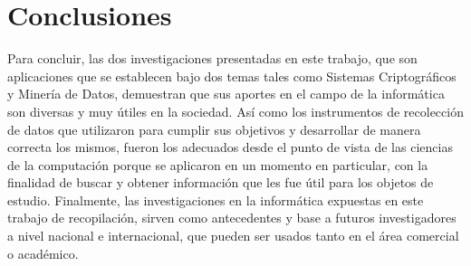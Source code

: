 \documentclass[10pt,journal]{IEEEtran}
\begin{document}
    \section{\textbf{Conclusiones}}
    Para concluir, las dos investigaciones presentadas en este trabajo,  que son aplicaciones que se establecen bajo dos temas tales como Sistemas Criptográficos y Minería de Datos, demuestran que sus aportes en el campo de la informática son diversas y muy útiles en la sociedad. Así como los instrumentos de recolección de datos que utilizaron para cumplir sus objetivos y desarrollar de manera correcta los mismos, fueron los adecuados desde el punto de vista de las ciencias de la computación porque se aplicaron en un momento en particular, con la finalidad de buscar y obtener información que les fue útil para los objetos de estudio. Finalmente, las investigaciones en la informática expuestas en este trabajo de recopilación, sirven como antecedentes y base a futuros investigadores a nivel nacional e internacional, que pueden ser usados tanto en el área comercial o académico.
\medskip

\end{document}
